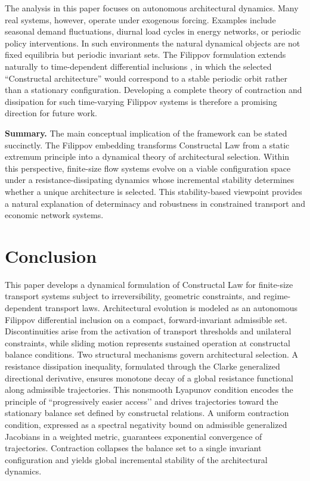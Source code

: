 \documentclass[12pt]{article}
\theoremstyle{plain}
\theoremstyle{definition}
\theoremstyle{remark}
\begin{document}
The analysis in this paper focuses on autonomous architectural
dynamics.
Many real systems, however, operate under exogenous forcing.
Examples include seasonal demand fluctuations, diurnal load cycles
in energy networks, or periodic policy interventions.
In such environments the natural dynamical objects are not fixed
equilibria but periodic invariant sets.
The Filippov formulation extends naturally to time-dependent
differential inclusions
\cite{Filippov1988,diBernardo2008},
in which the selected ``Constructal architecture'' would correspond
to a stable periodic orbit rather than a stationary configuration.
Developing a complete theory of contraction and dissipation for such
time-varying Filippov systems is therefore a promising direction for
future work.

\medskip
\noindent
\textbf{Summary.}
The main conceptual implication of the framework can be stated
succinctly.
The Filippov embedding transforms Constructal Law from a static
extremum principle into a dynamical theory of architectural
selection.
Within this perspective, finite-size flow systems evolve on a viable
configuration space under a resistance-dissipating dynamics whose
incremental stability determines whether a unique architecture is
selected.
This stability-based viewpoint provides a natural explanation of
determinacy and robustness in constrained transport and economic
network systems.



\section{Conclusion}
\label{sec:conclusion}

This paper develops a dynamical formulation of Constructal Law for
finite-size transport systems subject to irreversibility,
geometric constraints, and regime-dependent transport laws.
Architectural evolution is modeled as an autonomous
Filippov differential inclusion on a compact,
forward-invariant admissible set.
Discontinuities arise from the activation of transport thresholds
and unilateral constraints, while sliding motion represents
sustained operation at constructal balance conditions.
Two structural mechanisms govern architectural selection. A resistance dissipation inequality, formulated through the
Clarke generalized directional derivative,
ensures monotone decay of a global resistance functional
along admissible trajectories.
This nonsmooth Lyapunov condition encodes the principle of
“progressively easier access’’ and drives trajectories toward
the stationary balance set defined by constructal relations. A uniform contraction condition, expressed as a spectral negativity
bound on admissible generalized Jacobians in a weighted metric,
guarantees exponential convergence of trajectories.
Contraction collapses the balance set to a single invariant
configuration and yields global incremental stability of the
architectural dynamics.
\end{document}
